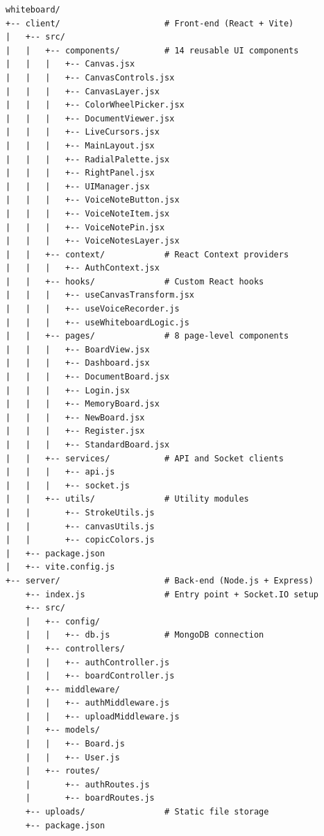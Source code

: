 \documentclass[12pt,a4paper]{report}
\begin{document}
\begin{verbatim}
whiteboard/
+-- client/                     # Front-end (React + Vite)
|   +-- src/
|   |   +-- components/         # 14 reusable UI components
|   |   |   +-- Canvas.jsx
|   |   |   +-- CanvasControls.jsx
|   |   |   +-- CanvasLayer.jsx
|   |   |   +-- ColorWheelPicker.jsx
|   |   |   +-- DocumentViewer.jsx
|   |   |   +-- LiveCursors.jsx
|   |   |   +-- MainLayout.jsx
|   |   |   +-- RadialPalette.jsx
|   |   |   +-- RightPanel.jsx
|   |   |   +-- UIManager.jsx
|   |   |   +-- VoiceNoteButton.jsx
|   |   |   +-- VoiceNoteItem.jsx
|   |   |   +-- VoiceNotePin.jsx
|   |   |   +-- VoiceNotesLayer.jsx
|   |   +-- context/            # React Context providers
|   |   |   +-- AuthContext.jsx
|   |   +-- hooks/              # Custom React hooks
|   |   |   +-- useCanvasTransform.jsx
|   |   |   +-- useVoiceRecorder.js
|   |   |   +-- useWhiteboardLogic.js
|   |   +-- pages/              # 8 page-level components
|   |   |   +-- BoardView.jsx
|   |   |   +-- Dashboard.jsx
|   |   |   +-- DocumentBoard.jsx
|   |   |   +-- Login.jsx
|   |   |   +-- MemoryBoard.jsx
|   |   |   +-- NewBoard.jsx
|   |   |   +-- Register.jsx
|   |   |   +-- StandardBoard.jsx
|   |   +-- services/           # API and Socket clients
|   |   |   +-- api.js
|   |   |   +-- socket.js
|   |   +-- utils/              # Utility modules
|   |       +-- StrokeUtils.js
|   |       +-- canvasUtils.js
|   |       +-- copicColors.js
|   +-- package.json
|   +-- vite.config.js
+-- server/                     # Back-end (Node.js + Express)
    +-- index.js                # Entry point + Socket.IO setup
    +-- src/
    |   +-- config/
    |   |   +-- db.js           # MongoDB connection
    |   +-- controllers/
    |   |   +-- authController.js
    |   |   +-- boardController.js
    |   +-- middleware/
    |   |   +-- authMiddleware.js
    |   |   +-- uploadMiddleware.js
    |   +-- models/
    |   |   +-- Board.js
    |   |   +-- User.js
    |   +-- routes/
    |       +-- authRoutes.js
    |       +-- boardRoutes.js
    +-- uploads/                # Static file storage
    +-- package.json
\end{verbatim}
\end{document}
